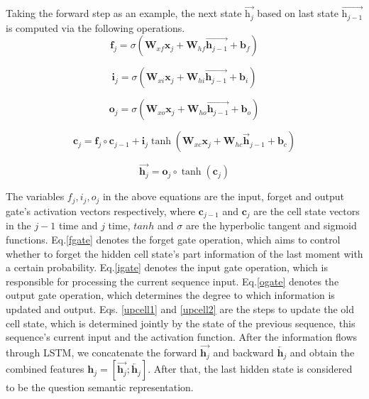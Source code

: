 \documentclass[pdflatex,sn-mathphys]{sn-jnl}%
\theoremstyle{thmstyleone}%
\theoremstyle{thmstyletwo}%
\theoremstyle{thmstylethree}%
\begin{document}
Taking the forward step as an example, the next state ${\overrightarrow{\mathrm{h}_{j}}}$ based on last state ${\overrightarrow{\mathrm{h}_{j-1}}}$ is computed via the following operations.
\begin{equation}
\label{fgate}
    \mathbf{f}_{j}=\sigma\left(\mathbf{W}_{x f} \mathbf{x}_{j}+\mathbf{W}_{h f} \overrightarrow{\mathbf{h}_{j-1}}+\mathbf{b}_{f}\right)
\end{equation}

\begin{equation}
\label{igate}
    \mathbf{i}_{j}=\sigma\left(\mathbf{W}_{x i} \mathbf{x}_{j}+\mathbf{W}_{h i} \overrightarrow{\mathbf{h}_{j-1}}+\mathbf{b}_{i}\right)
\end{equation}

\begin{equation}
\label{ogate}
    \mathbf{o}_{j}=\sigma\left(\mathbf{W}_{x o} \mathbf{x}_{j}+\mathbf{W}_{h o} \overrightarrow{\mathbf{h}_{j-1}}+\mathbf{b}_{o}\right)
\end{equation}

\begin{equation}
\label{upcell1}
\mathbf{c}_{j}=\mathbf{f}_{j} \circ \mathbf{c}_{j-1}+\mathbf{i}_{j} \tanh \left(\mathbf{W}_{x c} \mathbf{x}_{j}+\mathbf{W}_{h c} \overrightarrow{\mathbf{h}}_{j-1}+\mathbf{b}_{c}\right)
\end{equation}

\begin{equation}
\label{upcell2}
\overrightarrow{\mathbf{h}_{j}}=\mathbf{o}_{j} \circ \tanh \left(\mathbf{c}_{j}\right)
\end{equation}

\textcolor[rgb]{1,0,0}{The variables $f_{j}, i_{j}, o_{j}$ in the above equations are the input, forget and output gate's activation vectors respectively, where $\mathbf{c}_{j-1}$ and $\mathbf{c}_{j}$ are the cell state vectors in the $j-1$ time and $j$ time, $tanh$ and $\sigma$ are the hyperbolic tangent and sigmoid functions.
Eq.\ref{fgate} denotes the forget gate operation, which aims to control whether to forget the hidden cell state's part information of the last moment with a certain probability. Eq.\ref{igate} denotes the input gate operation, which is responsible for processing the current sequence input. Eq.\ref{ogate} denotes the output gate operation, which determines the degree to which information is updated and output. Eqs. \ref{upcell1} and \ref{upcell2} are the steps to update the old cell state, which is determined jointly by the state of the previous sequence, this sequence's current input and the activation function.
After the information flows through LSTM, we concatenate the forward $\overrightarrow{\mathbf{h}_{j}}$ and backward $\overleftarrow{\mathbf{h}_{j}}$ and obtain the combined features $\mathbf{h}_{j} = [\overrightarrow{\mathbf{h}_{j}};\overleftarrow{\mathbf{h}_{j}}]$. After that, the last hidden state is considered to be the question semantic representation.}
 
\end{document}

